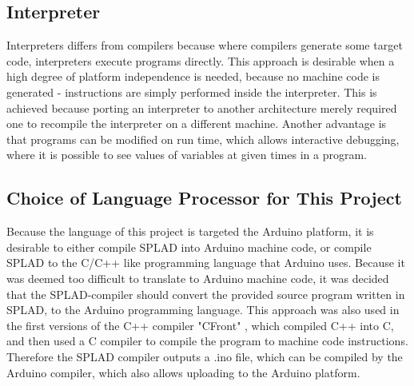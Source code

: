 
\subsection{Interpreter}
Interpreters differs from compilers because where compilers generate some target code, interpreters execute programs directly. This approach is desirable when a high degree of platform independence is needed, because no machine code is generated - instructions are simply performed inside the interpreter. This is achieved because porting an interpreter to another architecture merely required one to recompile the interpreter on a different machine. Another advantage is that programs can be modified on run time, which allows interactive debugging, where it is possible to see values of variables at given times in a program. 

\subsection{Choice of Language Processor for This Project}
Because the language of this project is targeted the Arduino platform, it is desirable to either compile SPLAD into Arduino machine code, or compile SPLAD to the C/C++ like programming language that Arduino uses. Because it was deemed too difficult to translate to Arduino machine code, it was decided that the SPLAD-compiler should convert the provided source program written in SPLAD, to the Arduino programming language. This approach was also used in the first versions of the C++ compiler "CFront" \citep{sebesta}, which compiled C++ into C, and then used a C compiler to compile the program to machine code instructions. Therefore the SPLAD compiler outputs a .ino file, which can be compiled by the Arduino compiler, which also allows uploading to the Arduino platform. 